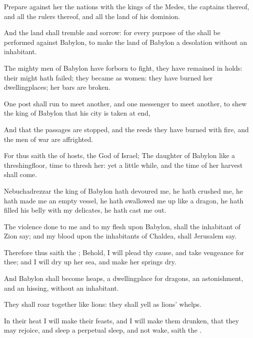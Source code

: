 {Prepare against her the
nations with the
kings of the
Medes, the
captains thereof, and all the
rulers thereof, and all the
land of his
dominion.

And the
land shall
tremble and
sorrow: for every
purpose of the
{} shall be
performed against
Babylon, to
make the
land of
Babylon a
desolation without an
inhabitant.

The mighty
men of
Babylon have
forborn to
fight, they have
remained in
{}
holds: their
might hath
failed; they became as
women: they have
burned her
dwellingplaces; her
bars are
broken.

One
post shall
run to
meet
another, and one
messenger to
meet
another, to
shew the
king of
Babylon that his
city is
taken at
{}
end,

And that the
passages are
stopped, and the
reeds they have
burned with
fire, and the
men of
war are
affrighted.

For thus
saith the
{} of
hosts, the
God of
Israel; The
daughter of
Babylon
{} like a
threshingfloor,
{}
time to
thresh her: yet a little
while, and the
time of her
harvest shall
come.

Nebuchadrezzar the
king of
Babylon hath
devoured me, he hath
crushed me, he hath
made me an
empty
vessel, he hath swallowed me
up like a
dragon, he hath
filled his
belly with my
delicates, he hath cast me
out.

The
violence done to me and to my
flesh
{} upon
Babylon, shall the
inhabitant of
Zion
say; and my
blood upon the
inhabitants of
Chaldea, shall
Jerusalem
say.

Therefore thus
saith the
{}; Behold, I will
plead thy
cause, and take
vengeance for
thee; and I will dry
up her
sea, and make her
springs
dry.

And
Babylon shall become
heaps, a
dwellingplace for
dragons, an
astonishment, and an
hissing, without an
inhabitant.

They shall
roar
together like
lions: they shall
yell as
lions’
whelps.

In their
heat I will
make their
feasts, and I will make them
drunken, that they may
rejoice, and
sleep a
perpetual
sleep, and not
wake,
saith the
{}.

}
